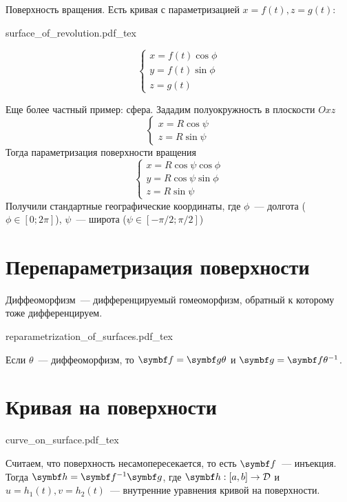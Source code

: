 \documentclass[main]{subfiles}
\begin{document}
\begin{example}
    Поверхность вращения.
    Есть кривая с параметризацией $x = f(t), z = g(t)$:

    \begin{minipage}{0.59\textwidth}
        {surface_of_revolution.pdf_tex}
    \end{minipage}
    \begin{minipage}{0.35\textwidth}
        \[\begin{cases}
                x = f(t) \cos \phi \\
                y = f(t) \sin \phi \\
                z = g(t)
            \end{cases}\]
    \end{minipage}
\end{example}
\begin{example}
    Еще более частный пример: сфера.
    Зададим полуокружность в плоскости $Oxz$
    \[\begin{cases}
            x = R \cos \psi \\
            z = R \sin \psi
        \end{cases}\]
    Тогда параметризация поверхности вращения
    \[\begin{cases}
            x = R \cos \psi \cos \phi \\
            y = R \cos \psi \sin \phi \\
            z = R \sin \psi
        \end{cases}\]
    Получили стандартные географические координаты, где
    $\phi$~--- долгота ($\phi \in [0;2 \pi]$), $\psi$~--- широта ($\psi \in [-\pi/2 ; \pi/2]$)
\end{example}

\section{Перепараметризация поверхности}
\begin{definition}[Диффеоморфизм]
    Диффеоморфизм~--- дифференцируемый гомеоморфизм, обратный к которому тоже дифференцируем.
\end{definition}
\begin{center}
    {reparametrization_of_surfaces.pdf_tex}
\end{center}
Если $\theta$~--- диффеоморфизм, то $\vf = \vg \theta$ и $\vg = \vf \theta^{-1}$.

\section{Кривая на поверхности}
\begin{center}
    {curve_on_surface.pdf_tex}
\end{center}
Считаем, что поверхность несамопересекается, то есть $\vf$~--- инъекция.
Тогда $\vh = \vf^{-1}\vg$, где $\vh: [a,b] \to \fancyD$ и $u = h_1(t), v = h_2(t)$~--- внутренние уравнения кривой на поверхности.
\end{document}
